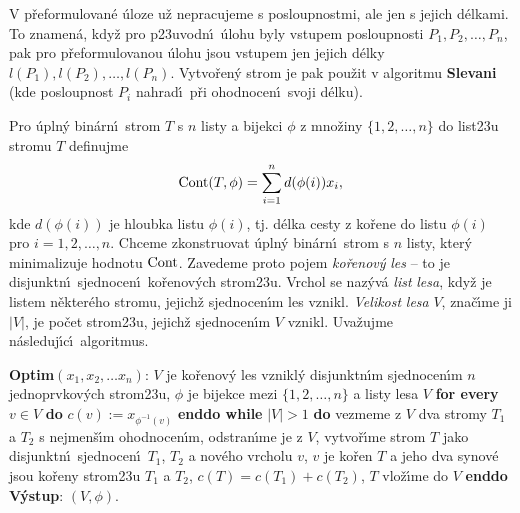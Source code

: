 \flushpar V p\v reformulovan\'e \'uloze u\v z nepracujeme s 
posloupnostmi, ale jen s jejich d\'elkami. 
To znamen\'a, kdy\v z pro p\accent23uvodn\'\i\ \'ulohu 
byly vstupem posloupnosti $P_1,P_2,\dots,P_n$, pak pro 
p\v reformulovanou \'ulohu jsou vstupem jen jejich d\'elky  
$l(P_1),l(P_2),\dots,l(P_n)$. Vy\-tvo\v ren\'y strom je pak pou\-\v zit v algoritmu {\bf Slevani }
(kde posloupnost $P_i$ nahrad\'\i\ p\v ri ohodnocen\'\i\ svoji d\'elku).
\medskip

\flushpar Pro \'upln\'y bin\'arn\'\i\ strom $T$ s $n$ listy a bijekci $
\phi$ 
z mno\v ziny $\{1,2,\dots,n\}$ do list\accent23u stromu $T$ 
definujme 
$$\operatorname{Cont}(T,\phi )=\sum_{i=1}^nd(\phi (i))x_i,$$
kde $d(\phi (i))$ je hloubka listu $\phi (i)$, tj.  d\'elka cesty z 
ko\v rene do listu $\phi (i)$ pro $i=1,2,\dots,n$.  
Chceme zkonstruovat \'upln\'y bin\'arn\'\i\ strom s $n$ listy, 
kter\'y minimalizuje hodnotu $\operatorname{Cont}$. Zavedeme proto pojem 
\emph{ko\v renov\'y} \emph{les} -- to je disjunktn\'\i\ sjednocen\'\i\ 
ko\v re\-no\-v\'ych strom\accent23u. Vrchol se naz\'yv\'a \emph{list} 
\emph{lesa}, kdy\v z je listem n\v ekter\'eho stromu, jejich\v z 
sjednocen\'\i m les vznikl. \emph{Velikost} \emph{lesa} $V$, zna\v c\'\i me 
ji $|V|$, je po\v cet strom\accent23u, jejich\v z sjednocen\'\i m $
V$ vznikl.
Uva\v zujme n\'asleduj\'\i c\'\i\ algoritmus.  
\bigskip

{\bf Optim$(x_1,x_2,\dots x_n)$}:\newline 
$V$ je ko\v renov\'y les vznikl\'y disjunktn\'\i m sjednocen\'\i m $
n$ 
jednoprvkov\'ych strom\accent23u,\newline 
$\phi$ je bijekce mezi $\{1,2,\dots,n\}$ a listy lesa $V$\newline 
{\bf for every} $v\in V$ {\bf do} $c(v):=x_{\phi^{-1}(v)}$ {\bf enddo\newline 
while} $|V|>1$ {\bf do}\newline 
\phantom{---}vezmeme z $V$ dva stromy $T_1$ a $T_2$ s nejmen\v s\'\i m 
ohodnocen\'\i m, odstran\'\i me je z $V$,\newline 
\phantom{---}vytvo\v r\'\i me strom $T$ jako disjunktn\'\i\ sjednocen\'\i\  
$T_1$, $T_2$ a nov\'eho vrcholu $v$, \newline 
\phantom{---}$v$ je ko\v ren $T$ a jeho dva synov\'e jsou ko\v reny strom\accent23u $
T_1$ a 
$T_2$, \newline 
\phantom{---}$c(T)=c(T_1)+c(T_2)$, $T$ vlo\v z\'\i me do $V$\newline 
{\bf enddo\newline 
V\'ystup}: $(V,\phi )$.
\bigskip


